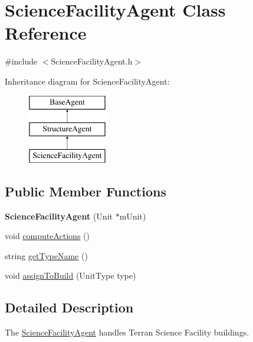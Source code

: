 \hypertarget{class_science_facility_agent}{
\section{ScienceFacilityAgent Class Reference}
\label{class_science_facility_agent}
}


{\ttfamily \#include $<$ScienceFacilityAgent.h$>$}

Inheritance diagram for ScienceFacilityAgent:\begin{figure}[H]
\begin{center}
\leavevmode
\includegraphics[height=3.000000cm]{class_science_facility_agent}
\end{center}
\end{figure}
\subsection*{Public Member Functions}
\begin{DoxyCompactItemize}
\item 
\hypertarget{class_science_facility_agent_a42e90cdc7fab696600568a2f24885e0f}{
{\bfseries ScienceFacilityAgent} (Unit $\ast$mUnit)}
\label{class_science_facility_agent_a42e90cdc7fab696600568a2f24885e0f}

\item 
void \hyperlink{class_science_facility_agent_aeb2cd482b337cc5e96307c710e0f951d}{computeActions} ()
\item 
string \hyperlink{class_science_facility_agent_aaf14b0b2641601516d18969552b15665}{getTypeName} ()
\item 
void \hyperlink{class_science_facility_agent_aa0749b77bba28ad952717418cf5d33b5}{assignToBuild} (UnitType type)
\end{DoxyCompactItemize}


\subsection{Detailed Description}
The \hyperlink{class_science_facility_agent}{ScienceFacilityAgent} handles Terran Science Facility buildings.

